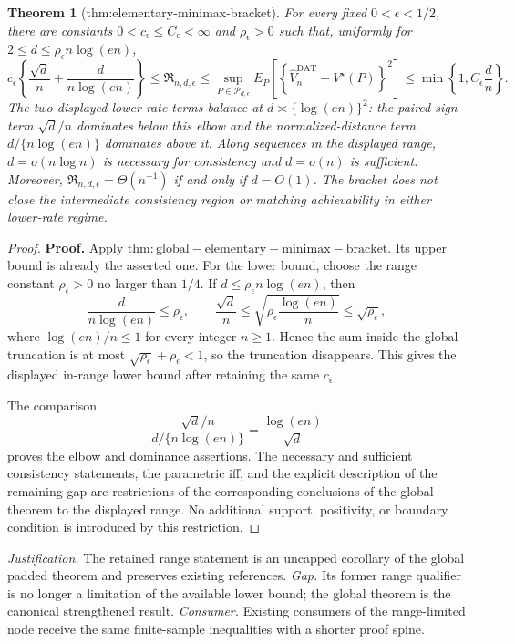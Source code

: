 \documentclass{article}
\newtheorem{theorem}{Theorem}
\begin{document}
\begin{theorem}[thm:elementary-minimax-bracket]\label{thm:elementary-minimax-bracket}
For every fixed \(0<\epsilon<1/2\), there are constants \(0<c_\epsilon\le C_\epsilon<\infty\) and \(\rho_\epsilon>0\) such that, uniformly for \(2\le d\le\rho_\epsilon n\log(en)\),
\[
 c_\epsilon\left\{\frac{\sqrt d}{n}+\frac d{n\log(en)}\right\}
 \le\mathfrak R_{n,d,\epsilon}
 \le\sup_{P\in\mathcal P_{d,\epsilon}}
 E_P\!\left[
  \left\{\widehat V_n^{\mathrm{DAT}}-V^\star(P)\right\}^2
 \right]
 \le\min\!\left\{1,C_\epsilon\frac dn\right\}.
\]
The two displayed lower-rate terms balance at \(d\asymp\{\log(en)\}^2\): the paired-sign term \(\sqrt d/n\) dominates below this elbow and the normalized-distance term \(d/\{n\log(en)\}\) dominates above it.  Along sequences in the displayed range, \(d=o(n\log n)\) is necessary for consistency and \(d=o(n)\) is sufficient.  Moreover, \(\mathfrak R_{n,d,\epsilon}=\Theta(n^{-1})\) if and only if \(d=O(1)\).  The bracket does not close the intermediate consistency region or matching achievability in either lower-rate regime.
\end{theorem}
\begin{proof}
\textbf{Proof.}
Apply \(\mathrm{thm:global-elementary-minimax-bracket}\).  Its upper bound is already the asserted one.  For the lower bound, choose the range constant \(\rho_\epsilon>0\) no larger than \(1/4\).  If \(d\le\rho_\epsilon n\log(en)\), then
\[
 \frac d{n\log(en)}\le\rho_\epsilon,
 \qquad
 \frac{\sqrt d}{n}
 \le\sqrt{\rho_\epsilon\frac{\log(en)}n}
 \le\sqrt{\rho_\epsilon},
\]
where \(\log(en)/n\le1\) for every integer \(n\ge1\).  Hence the sum inside the global truncation is at most \(\sqrt{\rho_\epsilon}+\rho_\epsilon<1\), so the truncation disappears.  This gives the displayed in-range lower bound after retaining the same \(c_\epsilon\).

The comparison
\[
 \frac{\sqrt d/n}{d/\{n\log(en)\}}
 =\frac{\log(en)}{\sqrt d}
\]
proves the elbow and dominance assertions.  The necessary and sufficient consistency statements, the parametric iff, and the explicit description of the remaining gap are restrictions of the corresponding conclusions of the global theorem to the displayed range.  No additional support, positivity, or boundary condition is introduced by this restriction.
\end{proof}
\par\smallskip\noindent \textit{Justification.} The retained range statement is an uncapped corollary of the global padded theorem and preserves existing references. \textit{Gap.} Its former range qualifier is no longer a limitation of the available lower bound; the global theorem is the canonical strengthened result. \textit{Consumer.} Existing consumers of the range-limited node receive the same finite-sample inequalities with a shorter proof spine.
\end{document}
